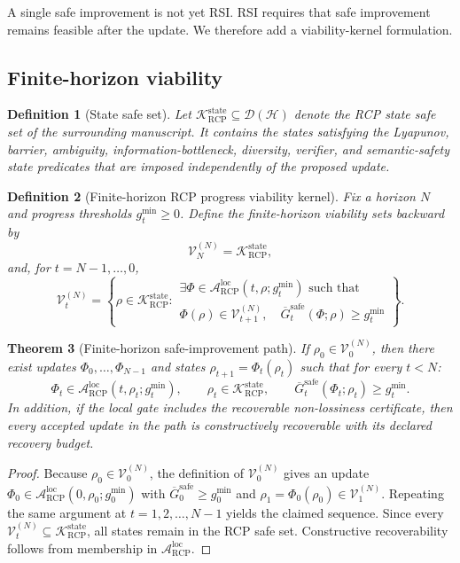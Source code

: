 \documentclass[11pt]{article}
\newtheorem{theorem}{Theorem}[section]
\newtheorem{definition}[theorem]{Definition}
\newcommand{\D}{\mathcal{D}}
\newcommand{\Hcal}{\mathcal{H}}
\newcommand{\K}{\mathcal{K}}
\newcommand{\Acal}{\mathcal{A}}
\newcommand{\1}{\mathbf{1}}
\newcommand{\RCP}{\mathrm{RCP}}
\newcommand{\state}{\mathrm{state}}
\newcommand{\safe}{\mathrm{safe}}
\providecommand{\Vcal}{\mathcal{V}}
\begin{document}
A single safe improvement is not yet RSI.  RSI requires that safe improvement remains feasible after the update.  We therefore add a viability-kernel formulation.

\subsection{Finite-horizon viability}

\begin{definition}[State safe set]
Let \(\K_{\RCP}^{\state}\subseteq\D(\Hcal)\) denote the RCP state safe set of the surrounding manuscript.  It contains the states satisfying the Lyapunov, barrier, ambiguity, information-bottleneck, diversity, verifier, and semantic-safety state predicates that are imposed independently of the proposed update.
\end{definition}

\begin{definition}[Finite-horizon RCP progress viability kernel]
Fix a horizon \(N\) and progress thresholds \(g_t^{\min}\ge0\).  Define the finite-horizon viability sets backward by
\[
\Vcal_N^{(N)}=\K_{\RCP}^{\state},
\]
and, for \(t=N-1,\dots,0\),
\[
\Vcal_t^{(N)}=
\left\{
\rho\in\K_{\RCP}^{\state}:
\begin{array}{l}
\exists\Phi\in\Acal_{\RCP}^{\mathrm{loc}}(t,\rho;g_t^{\min})\text{ such that}\\[0.2em]
\Phi(\rho)\in\Vcal_{t+1}^{(N)},\quad
\overline G_t^{\safe}(\Phi;\rho)\ge g_t^{\min}
\end{array}
\right\}.
\]
\end{definition}

\begin{theorem}[Finite-horizon safe-improvement path]
\label{thm:finite_horizon_viability_path}
If \(\rho_0\in\Vcal_0^{(N)}\), then there exist updates \(\Phi_0,\dots,\Phi_{N-1}\) and states \(\rho_{t+1}=\Phi_t(\rho_t)\) such that for every \(t<N\):
\[
\Phi_t\in\Acal_{\RCP}^{\mathrm{loc}}(t,\rho_t;g_t^{\min}),
\qquad
\rho_t\in\K_{\RCP}^{\state},
\qquad
\overline G_t^{\safe}(\Phi_t;\rho_t)
\ge g_t^{\min}.
\]
In addition, if the local gate includes the recoverable non-lossiness certificate, then every accepted update in the path is constructively recoverable with its declared recovery budget.
\end{theorem}

\begin{proof}
Because \(\rho_0\in\Vcal_0^{(N)}\), the definition of \(\Vcal_0^{(N)}\) gives an update \(\Phi_0\in\Acal_{\RCP}^{\mathrm{loc}}(0,\rho_0;g_0^{\min})\) with \(\overline G_0^{\safe}\ge g_0^{\min}\) and \(\rho_1=\Phi_0(\rho_0)\in\Vcal_1^{(N)}\).  Repeating the same argument at \(t=1,2,\dots,N-1\) yields the claimed sequence.  Since every \(\Vcal_t^{(N)}\subseteq\K_{\RCP}^{\state}\), all states remain in the RCP safe set.  Constructive recoverability follows from membership in \(\Acal_{\RCP}^{\mathrm{loc}}\).
\end{proof}
\end{document}
